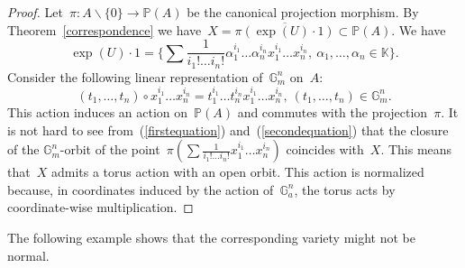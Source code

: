 \documentclass[a4paper,draft,reqno,12pt]{amsart}
\theoremstyle{definition}
\theoremstyle{definition}
\theoremstyle{remark}
\def\BG{{\mathbb G}}
\def\BK{{\mathbb K}}
\def\BG{{\mathbb G}}
\def\BK{{\mathbb K}}
\def\BP{{\mathbb P}}
\begin{document}
\begin{proof}
    Let~$\pi:A\backslash\{0\}\to\BP(A)$ be the canonical projection morphism. By Theorem~\ref{correspondence} we have~$X=\overline{\pi(\exp(U)\cdot1)}\subset\BP(A)$. We have \begin{equation}\label{firstequation}
        \exp(U)\cdot1 = \Bigg\{\sum \frac{1}{i_1!\dotsc i_n!}\alpha_1^{i_1}\dotsc \alpha_n^{i_n}x_1^{i_1}\dotsc x_n^{i_n}, \ \alpha_1,\dotsc,\alpha_n \in \BK\Bigg\}.
    \end{equation}
    Consider the following linear representation of~$\BG_m^n$ on~$A$: \begin{equation}\label{secondequation}
        (t_1, \dotsc, t_n) \circ x_1^{i_1}\dotsc x_n^{i_n} = t_1^{i_1}\dotsc t_n^{i_n}x_1^{i_1}\dotsc x_n^{i_n}, \ (t_1,\dotsc,t_n) \in \BG_m^n.
    \end{equation}
    This action induces an action on~$\BP(A)$ and commutes with the projection~$\pi$. It is not hard to see from~(\ref{firstequation}) and~(\ref{secondequation}) that the closure of the $\BG_m^n$-orbit of the point~$\pi(\sum\frac{1}{i_1!\dotsc i_n!}x_1^{i_1}\dotsc x_n^{i_n})$ coincides with~$X$. This means that~$X$ admits a torus action with an open orbit. This action is normalized because, in coordinates induced by the action of~$\BG_a^n$, the torus acts by coordinate-wise multiplication.
\end{proof}

The following example shows that the corresponding variety might not be normal.
\end{document}
